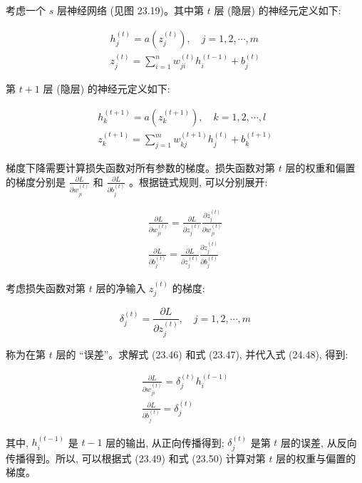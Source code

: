 \documentclass[10pt]{article}
\begin{document}
\begin{CJK*}{UTF8}{bsmi}
考虑一个 $s$ 层神经网络 (见图 23.19)。其中第 $t$ 层 (隐层) 的神经元定义如下:


\begin{gather*}
h_{j}^{(t)}=a\left(z_{j}^{(t)}\right), \quad j=1,2, \cdots, m  \tag{23.42}\\
z_{j}^{(t)}=\sum_{i=1}^{n} w_{j i}^{(t)} h_{i}^{(t-1)}+b_{j}^{(t)} \tag{23.43}
\end{gather*}


第 $t+1$ 层 (隐层) 的神经元定义如下:


\begin{gather*}
h_{k}^{(t+1)}=a\left(z_{k}^{(t+1)}\right), \quad k=1,2, \cdots, l  \tag{23.44}\\
z_{k}^{(t+1)}=\sum_{j=1}^{m} w_{k j}^{(t+1)} h_{j}^{(t)}+b_{k}^{(t+1)} \tag{23.45}
\end{gather*}


梯度下降需要计算损失函数对所有参数的梯度。损失函数对第 $t$ 层的权重和偏置的梯度分别是 $\frac{\partial L}{\partial w_{j i}^{(t)}}$ 和 $\frac{\partial L}{\partial b_{j}^{(t)}}$ 。根据链式规则, 可以分别展开:


\begin{gather*}
\frac{\partial L}{\partial w_{j i}^{(t)}}=\frac{\partial L}{\partial z_{j}^{(t)}} \frac{\partial z_{j}^{(t)}}{\partial w_{j i}^{(t)}}  \tag{23.46}\\
\frac{\partial L}{\partial b_{j}^{(t)}}=\frac{\partial L}{\partial z_{j}^{(t)}} \frac{\partial z_{j}^{(t)}}{\partial b_{j}^{(t)}} \tag{23.47}
\end{gather*}


考虑损失函数对第 $t$ 层的净输入 $z_{j}^{(t)}$ 的梯度:


\begin{equation*}
\delta_{j}^{(t)}=\frac{\partial L}{\partial z_{j}^{(t)}}, \quad j=1,2, \cdots, m \tag{23.48}
\end{equation*}


称为在第 $t$ 层的 “误差”。求解式 (23.46) 和式 (23.47), 并代入式 (24.48), 得到:


\begin{gather*}
\frac{\partial L}{\partial w_{j i}^{(t)}}=\delta_{j}^{(t)} h_{i}^{(t-1)}  \tag{23.49}\\
\frac{\partial L}{\partial b_{j}^{(t)}}=\delta_{j}^{(t)} \tag{23.50}
\end{gather*}


其中, $h_{i}^{(t-1)}$ 是 $t-1$ 层的输出, 从正向传播得到; $\delta_{j}^{(t)}$ 是第 $t$ 层的误差, 从反向传播得到。所以, 可以根据式 (23.49) 和式 (23.50) 计算对第 $t$ 层的权重与偏置的梯度。


\end{CJK*}
\end{document}
